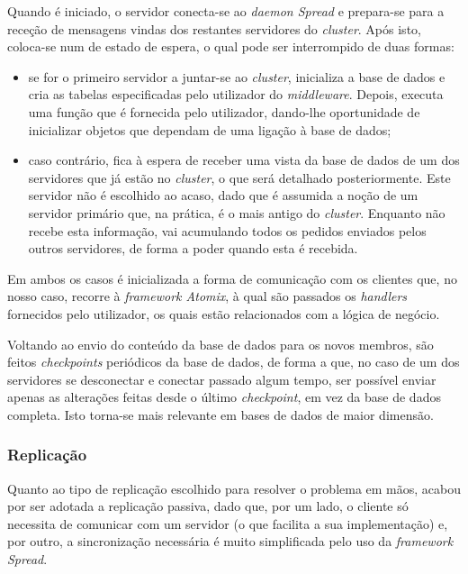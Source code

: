 \documentclass[a4paper]{report}
\begin{document}
{			Quando é iniciado, o servidor conecta-se ao \textit{daemon Spread} e prepara-se para a receção de mensagens vindas dos restantes servidores do \textit{cluster}. Após isto, coloca-se num de estado de espera, o qual pode ser interrompido de duas formas:
			\begin{itemize}
				\item se for o primeiro servidor a juntar-se ao \textit{cluster}, inicializa a base de dados e cria as tabelas especificadas pelo utilizador do \textit{middleware}. Depois, executa uma função que é fornecida pelo utilizador, dando-lhe oportunidade de inicializar objetos que dependam de uma ligação à base de dados;
				\item caso contrário, fica à espera de receber uma vista da base de dados de um dos servidores que já estão no \textit{cluster}, o que será detalhado posteriormente. Este servidor não é escolhido ao acaso, dado que é assumida a noção de um servidor primário que, na prática, é o mais antigo do \textit{cluster}. Enquanto não recebe esta informação, vai acumulando todos os pedidos enviados pelos outros servidores, de forma a poder quando esta é recebida.
			\end{itemize}
		
			Em ambos os casos é inicializada a forma de comunicação com os clientes que, no nosso caso, recorre à \textit{framework Atomix}, à qual são passados os \textit{handlers} fornecidos pelo utilizador, os quais estão relacionados com a lógica de negócio.
			
			Voltando ao envio do conteúdo da base de dados para os novos membros, são feitos \textit{checkpoints} periódicos da base de dados, de forma a que, no caso de um dos servidores se desconectar e conectar passado algum tempo, ser possível enviar apenas as alterações feitas desde o último \textit{checkpoint}, em vez da base de dados completa. Isto torna-se mais relevante em bases de dados de maior dimensão.

			\subsubsection{Replicação} \label{sssec:Replication}
				Quanto ao tipo de replicação escolhido para resolver o problema em mãos, acabou por ser adotada a replicação passiva, dado que, por um lado, o cliente só necessita de comunicar com um servidor (o que facilita a sua implementação) e, por outro, a sincronização necessária é muito simplificada pelo uso da \textit{framework Spread}.

}
\end{document}
